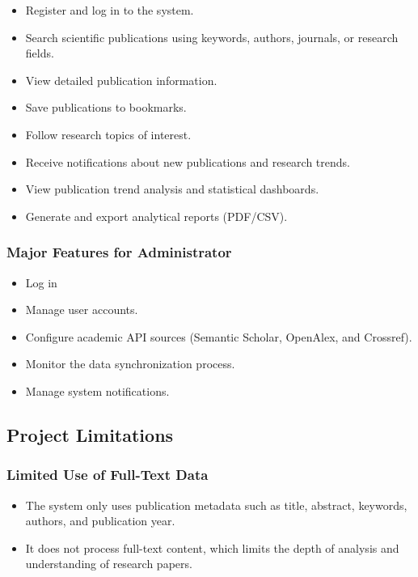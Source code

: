 \documentclass[12pt,a4paper]{article}
\begin{document}
\begin{itemize}
	\item Register and log in to the system.
	\item Search scientific publications using keywords, authors, journals, or research fields.
	\item View detailed publication information.
	\item Save publications to bookmarks.
	\item Follow research topics of interest.
	\item Receive notifications about new publications and research trends.
	\item View publication trend analysis and statistical dashboards.
	\item Generate and export analytical reports (PDF/CSV).
\end{itemize}

\subsubsection{Major Features for Administrator}

\begin{itemize}
	\item Log in 
	\item Manage user accounts.
	\item Configure academic API sources (Semantic Scholar, OpenAlex, and Crossref).
	\item Monitor the data synchronization process.
	\item Manage system notifications.


\end{itemize}
\subsection{Project Limitations}

\subsubsection{Limited Use of Full-Text Data}

	\begin{itemize}
		\item The system only uses publication metadata such as title, abstract, keywords, authors, and publication year.
		\item It does not process full-text content, which limits the depth of analysis and understanding of research papers.
	\end{itemize}
	
\end{document}
